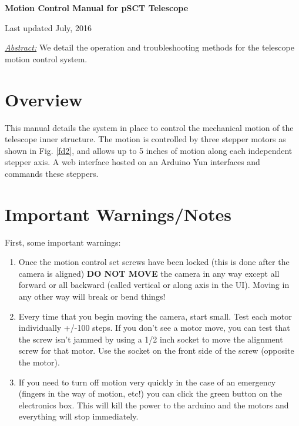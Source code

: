 \documentclass[11pt]{article}
\begin{document}
\begin{center}
{\bf{\huge{Motion Control Manual for pSCT Telescope}}}

\vspace{0.1in}
Last updated July, 2016

\vspace{0.3in}
{\it{\underline{Abstract:}}} We detail the operation and troubleshooting methods for the telescope motion control system.

\end{center}

\tableofcontents

\vspace{0.2in}


\section{Overview}

This manual details the system in place to control the mechanical motion of the telescope inner structure.
The motion is controlled by three stepper motors as shown in Fig. \ref{fd2}, and allows up to 5 inches of motion along each independent stepper axis. 
A web interface hosted on an Arduino Yun interfaces and commands these steppers.


\section{Important Warnings/Notes}

First, some important warnings:
\begin{enumerate}
	\item Once the motion control set screws have been locked (this is done after the camera is aligned) {\bf DO NOT MOVE} the camera in any way except all forward or all backward (called vertical or along axis in the UI).
	Moving in any other way will break or bend things!
	\item Every time that you begin moving the camera, start small.  Test each motor individually +/-100 steps.  
		If you don't see a motor move, you can test that the screw isn't jammed by using a 1/2 inch socket to move the alignment screw for that motor.
		Use the socket on the front side of the screw (opposite the motor).
	\item If you need to turn off motion very quickly in the case of an emergency (fingers in the way of motion, etc!) you can click the green button on the electronics box.
		 This will kill the power to the arduino and the motors and everything will stop immediately.
\end{enumerate}
\end{document}
